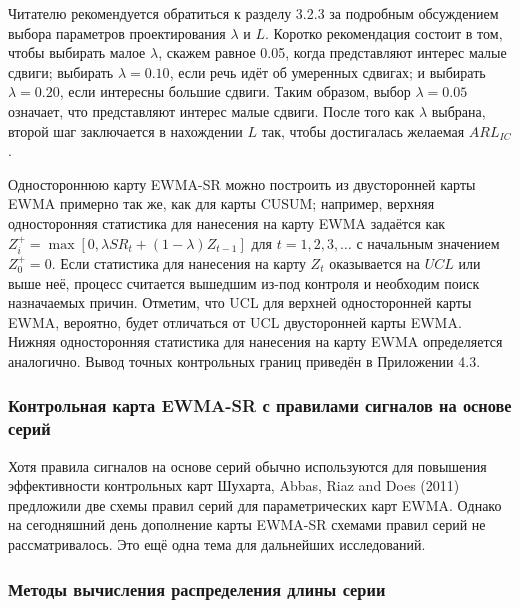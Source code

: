 Читателю рекомендуется обратиться к разделу 3.2.3 за подробным обсуждением выбора параметров проектирования \(\lambda\) и \(L\). Коротко рекомендация состоит в том, чтобы выбирать малое \(\lambda\), скажем равное 0.05, когда представляют интерес малые сдвиги; выбирать \(\lambda = 0.10\), если речь идёт об умеренных сдвигах; и выбирать \(\lambda = 0.20\), если интересны большие сдвиги. Таким образом, выбор \(\lambda = 0.05\) означает, что представляют интерес малые сдвиги. После того как \(\lambda\) выбрана, второй шаг заключается в нахождении \(L\) так, чтобы достигалась желаемая \(ARL_{IC}\).

Одностороннюю карту EWMA-SR можно построить из двусторонней карты EWMA примерно так же, как для карты CUSUM; например, верхняя односторонняя статистика для нанесения на карту EWMA задаётся как \(Z_i^+ = \max[0, \lambda SR_t + (1 - \lambda)Z_{t-1}]\) для \(t = 1, 2, 3, \ldots\) с начальным значением \(Z_0^+ = 0\). Если статистика для нанесения на карту \(Z_t\) оказывается на \(UCL\) или выше неё, процесс считается вышедшим из-под контроля и необходим поиск назначаемых причин. Отметим, что UCL для верхней односторонней карты EWMA, вероятно, будет отличаться от UCL двусторонней карты EWMA. Нижняя односторонняя статистика для нанесения на карту EWMA определяется аналогично. Вывод точных контрольных границ приведён в Приложении 4.3.

\subsubsection{Контрольная карта EWMA-SR с правилами сигналов на основе серий}
Хотя правила сигналов на основе серий обычно используются для повышения эффективности контрольных карт Шухарта, Abbas, Riaz and Does (2011) предложили две схемы правил серий для параметрических карт EWMA. Однако на сегодняшний день дополнение карты EWMA-SR схемами правил серий не рассматривалось. Это ещё одна тема для дальнейших исследований.

\subsubsection{Методы вычисления распределения длины серии}
